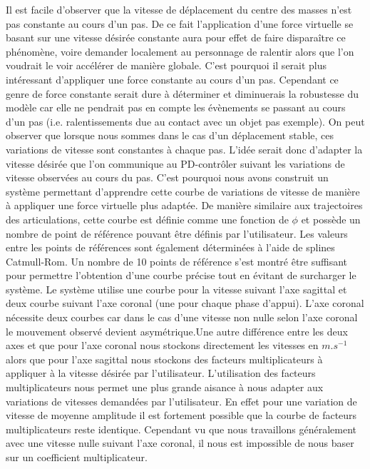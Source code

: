 \documentclass{llncs}
\begin{document}
Il est facile d'observer que la vitesse de déplacement du centre des masses n'est pas constante au cours d'un pas. De ce fait l'application d'une force virtuelle se basant sur une vitesse désirée constante aura pour effet de faire disparaître ce phénomène, voire demander localement au personnage de ralentir alors que l'on voudrait le voir accélérer de manière globale. C'est pourquoi il serait plus intéressant d'appliquer une force constante au cours d'un pas. Cependant ce genre de force constante serait dure à déterminer et diminuerais la robustesse du modèle car elle ne pendrait pas en compte les évènements se passant au cours d'un pas (i.e. ralentissements due au contact avec un objet pas exemple). On peut observer que lorsque nous sommes dans le cas d'un déplacement stable, ces variations de vitesse sont constantes à chaque pas. L'idée serait donc d'adapter la vitesse désirée que l'on communique au PD-contrôler suivant les variations de vitesse observées au cours du pas. C'est pourquoi nous avons construit un système permettant d'apprendre cette courbe de variations de vitesse de manière à appliquer une force virtuelle plus adaptée. De manière similaire aux trajectoires des articulations, cette courbe est définie comme une fonction de \(\phi\) et possède un nombre de point de référence pouvant être définis par l'utilisateur. Les valeurs entre les points de références sont également déterminées à l'aide de splines Catmull-Rom. Un nombre de 10 points de référence s'est montré être suffisant pour permettre l'obtention d'une courbe précise tout en évitant de surcharger le système. Le système utilise une courbe pour la vitesse suivant l'axe sagittal et deux courbe suivant l'axe coronal (une pour chaque phase d'appui). L'axe coronal nécessite deux courbes car dans le cas d'une vitesse non nulle selon l'axe coronal le mouvement observé devient asymétrique.Une autre différence entre les deux axes et que pour l'axe coronal nous stockons directement les vitesses en $m.s^{-1}$ alors que pour l'axe sagittal nous stockons des facteurs multiplicateurs à appliquer à la vitesse désirée par l'utilisateur. L'utilisation des facteurs multiplicateurs nous permet une plus grande aisance à nous adapter aux variations de vitesses demandées par l'utilisateur. En effet pour une variation de vitesse de moyenne amplitude il est fortement possible que la courbe de facteurs multiplicateurs reste identique. Cependant vu que nous travaillons généralement avec une vitesse nulle suivant l'axe coronal, il nous est impossible de nous baser sur un coefficient multiplicateur.
\end{document}
